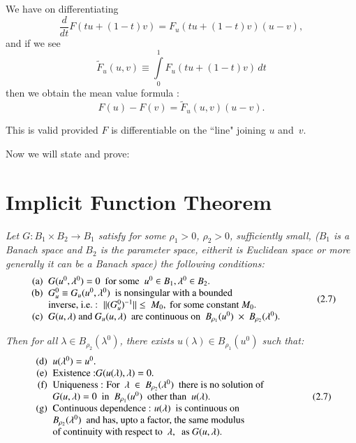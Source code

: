 We have on differentiating
$$
\frac{d}{dt} F(tu+(1-t)v) = F_{u}(tu+(1-t)v) (u-v), 
$$
and if we see
$$
\tilde{F}_{u}(u,v) \equiv \int\limits^{1}_{0} F_{u}(tu+(1-t)v)\,dt 
$$
then we obtain the mean value formula :
\begin{equation*}
F(u) - F(v) = \tilde{F}_{u} (u,v)
(u-v). \tag{2.6}\label{chap2-sec2.5-eq2.6}    
\end{equation*} 

This is valid provided $F$ is differentiable on the ``line" joining
$u$ and~$v$. 
 
Now we will state and prove:

\setcounter{section}{6}
\section{Implicit Function Theorem}\label{chap2-sec2.7}%

\textit{Let $G : B_{1} \times  B_{2} \to B_{1}$ satisfy for
   some $\rho_{1} > 0$, $\rho_{2} > 0$, sufficiently small,
 ($B_{1}$ is a Banach space and $B_{2}$ is the parameter space, 
either\pageoriginale it is Euclidean space or more generally it can be a Banach
space) the following conditions:} 
\begin{equation*}
\centering
\begin{array}{r@{\;\;}>{$}p{9cm}<{$}@{}}
\text{(a)} & G (u^0, \lambda^0) = 0 \text{ \ for some \ }
u^0 \in B_1, \lambda^0 \in B_2.\\ 
\text{(b)} & G^0_u \equiv G_u (u^0, \lambda^0)
\text{ \ is nonsingular with a bounded}\newline
\text{inverse, i.e.~: \ } \|
(G^0_u)^{-1} \| \le~M_0,~\text{for some constant } M_0.\\ 
\text{(c)} & G (u, \lambda ) \text{ and } G_u (u,
\lambda ) \text{ \ are continuous on \ } B_{\rho_1}(u^0)~\times~B_{\rho_2}(\lambda^0).
\end{array}\tag{2.7}\label{chap2-sec2.7-eq2.7}    
\end{equation*}


\textit{Then for all $\lambda \in
B_{\rho_2}(\lambda^0)$, there exists  $u(\lambda) \in B_{\rho_1}(u^0)$ 
such that:} 
\begin{equation*}
\begin{array}{r@{\;\;}>{$}p{8.5cm}<{$}}
\text{(d)} & u(\lambda^0) = u^0.\\  
\text{(e)} & \text{Existence~:} G(u(\lambda), \lambda) =
0.\\ 
\text{(f)} & \text{Uniqueness~: For \ } \lambda~\in~B_{\rho_2}(\lambda^0) \text{ \ there is no solution of}\newline  
G(u, \lambda ) = 0 \text{ \ in \ } B_{\rho_1}(u^0) 
\text{ \ other than \ } u(\lambda).\\   
\text{(g)} & \text{Continuous dependence~: } u(\lambda)
  \text{ \ is continuous on \ }\newline B_{\rho_2}(\lambda^0)  \text{
    \ and has, upto a factor, the same modulus}\newline \text{of
    continuity with respect to \ } \lambda, \text{ \ as\ } G(u, \lambda). 
\end{array}\tag{2.7}\label{chap2-sec2.7-addeq2.7}    
\end{equation*}

